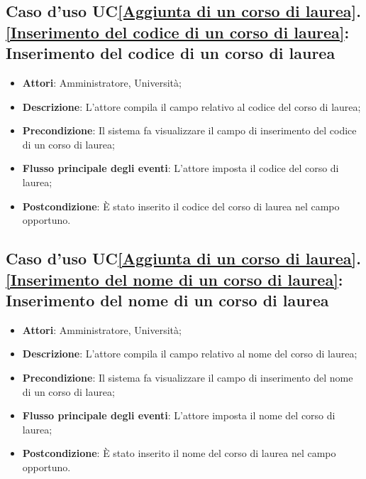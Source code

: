\subsection{Caso d'uso UC\ref{Aggiunta di un corso di laurea}.\ref{Inserimento del codice di un corso di laurea}: Inserimento del codice di un corso di laurea}
\begin{itemize}
	\item \textbf{Attori}: Amministratore, Università;
	\item \textbf{Descrizione}: L'attore compila il campo relativo al codice del corso di laurea;
	\item \textbf{Precondizione}: Il sistema fa visualizzare il campo di inserimento del codice di un corso di laurea;
	\item \textbf{Flusso principale degli eventi}: L'attore imposta il codice del corso di laurea;
	\item \textbf{Postcondizione}: È stato inserito il codice del corso di laurea nel campo opportuno.
\end{itemize}



\subsection{Caso d'uso UC\ref{Aggiunta di un corso di laurea}.\ref{Inserimento del nome di un corso di laurea}: Inserimento del nome di un corso di laurea}
\begin{itemize}
	\item \textbf{Attori}: Amministratore, Università;
	\item \textbf{Descrizione}: L'attore compila il campo relativo al nome del corso di laurea;
	\item \textbf{Precondizione}: Il sistema fa visualizzare il campo di inserimento del nome di un corso di laurea;
	\item \textbf{Flusso principale degli eventi}: L'attore imposta il nome del corso di laurea;
	\item \textbf{Postcondizione}: È stato inserito il nome del corso di laurea nel campo opportuno.
\end{itemize}

